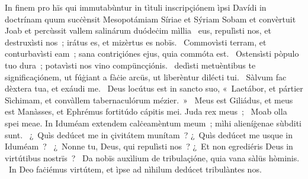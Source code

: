 {  In finem pro hïs qui immutabùntur in tìtuli inscripçiónem ìpsi Davídi in doctrínam  quum sucċènsit Mesopotámiam Síriae et Sýriam Sobam et convèrtuit Joab et percùssit vallem salinárum duódeċim mìllia}
{%
~eus, repulìsti nos, et destruxìsti nos~; irátus es, et mizèrtus es nobïs. 
~Commovìsti terram, et conturbavìsti eam~; sana contriçiónes ejus, quia commóta est. 
~Ostensìsti pòpulo tuo dura~; potavìsti nos vino compüncçiónis. 
~dedìsti metuèntibus te significaçiónem, ut fúġiant a fàċie arcüs, ut liberèntur dilécti tui. 
~Sàlvum fac dèxtera tua, et exáudi me. 
~Deus locútus est in sancto suo, «~Laetábor, et pártier Sìchimam, et convàllem tabernaculórum mézier.~»
~Meus est Giliádus, et meus est Manàsses, et Ephrémus fortitúdo cápitis mei. Juda rex meus~; 
~Moab olla spei meae. In Iduméam extendem calċeamèntum meum~; mìhi alieníġenae sùbditi sunt. 
~¿~Quìs dedúcet me in çivitátem munítam~? ¿~Quìs dedúcet me usque in Iduméam~? 
~¿~Nonne tu, Deus, qui repulìsti nos~? ¿~Et non egrediéris Deus in virtútibus nostrïs~? 
~Da nobïs auxìlium de tribulaçióne, quia vana sàlüs hòminis. 
~In Deo faċiémus virtútem, et ìpse ad nìhilum dedúcet tribulàntes nos. 
}
